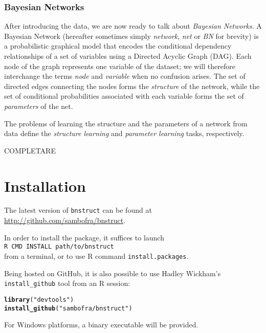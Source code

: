 \documentclass{article}\usepackage[]{graphicx}\usepackage[]{color}
\makeatletter
\newcommand{\hlstr}[1]{\textcolor[rgb]{0.192,0.494,0.8}{#1}}%
\newcommand{\hlstd}[1]{\textcolor[rgb]{0.345,0.345,0.345}{#1}}%
\newcommand{\hlkwd}[1]{\textcolor[rgb]{0.737,0.353,0.396}{\textbf{#1}}}%
\newenvironment{kframe}{%
 \def\at@end@of@kframe{}%
 \ifinner\ifhmode%
  \def\at@end@of@kframe{\end{minipage}}%
  \begin{minipage}{\columnwidth}%
 \fi\fi%
 \def\FrameCommand##1{\hskip\@totalleftmargin \hskip-\fboxsep
 \colorbox{shadecolor}{##1}\hskip-\fboxsep
     \hskip-\linewidth \hskip-\@totalleftmargin \hskip\columnwidth}%
 \MakeFramed {\advance\hsize-\width
   \@totalleftmargin\z@ \linewidth\hsize
   \@setminipage}}%
 {\par\unskip\endMakeFramed%
 \at@end@of@kframe}
\newenvironment{knitrout}{}{} %
\newcommand{\Rpackage}[1]{{\texttt{#1}}}
\makeatother
\begin{document}
\subsubsection{Bayesian Networks}
After introducing the data, we are now ready to talk about \emph{Bayesian Networks}. A Bayesian Network
(hereafter sometimes simply \emph{network}, \emph{net} or \emph{BN} for brevity) is a probabilistic graphical model that encodes
the conditional dependency relationships of a set of variables using a Directed Acyclic Graph (DAG).
Each node of the graph represents one variable of the dataset; we will therefore interchange
the terms \emph{node} and \emph{variable} when no confusion arises. The set of directed edges
connecting the nodes forms the \emph{structure} of the network, while the set of conditional
probabilities associated with each variable forms the set of \emph{parameters} of the net.

The problems of learning the structure and the parameters of a network from data define the
\emph{structure learning} and \emph{parameter learning} tasks, respectively. 

COMPLETARE

\section{Installation}

The latest version of \Rpackage{bnstruct} can be found at \url{http://github.com/sambofra/bnstruct}.

In order to install the package, it suffices to launch\\
\verb!R CMD INSTALL path/to/bnstruct!\\
from a terminal, or to use R command \verb!install.packages!.

Being hosted on GitHub, it is also possible to use Hadley Wickham's \texttt{install\_github} tool from
an R session:
\begin{knitrout}
\color{fgcolor}\begin{kframe}
\begin{alltt}
\hlkwd{library}\hlstd{(}\hlstr{"devtools"}\hlstd{)}
\hlkwd{install_github}\hlstd{(}\hlstr{"sambofra/bnstruct"}\hlstd{)}
\end{alltt}
\end{kframe}
\end{knitrout}

For Windows platforms, a binary executable will be provided.
\end{document}
